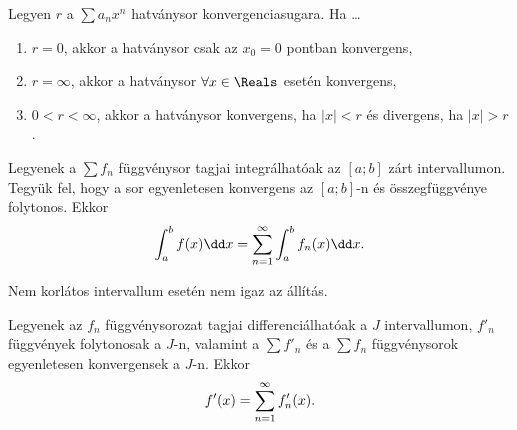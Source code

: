 \documentclass[a4paper, 12pt]{scrartcl}
\begin{document}
\begin{theorem}
  Legyen $r$ a $\sum a_n x^n$ hatványsor konvergenciasugara. Ha \dots
  \begin{enumerate}
    \item $r = 0$, akkor a hatványsor csak az $x_0 = 0$ pontban konvergens,
    \item $r = \infty$, akkor a hatványsor $\forall x \in \Reals$ esetén
          konvergens,
    \item $0 < r < \infty$, akkor a hatványsor konvergens, ha $|x| < r$ és
          divergens, ha $|x| > r$.
  \end{enumerate}

  \begin{center}
  \end{center}
\end{theorem}

\begin{theorem}
  Legyenek a $\sum f_n$ függvénysor tagjai integrálhatóak az $[a; b]$ zárt
  intervallumon. Tegyük fel, hogy a sor egyenletesen konvergens az $[a; b]$-n
  és összegfüggvénye folytonos. Ekkor
  $$
    \int_a^b f(x) \dd x = \sum_{n = 1}^{\infty} \int_a^b f_n(x) \dd x
    \text.
  $$
\end{theorem}

\begin{note}
  Nem korlátos intervallum esetén nem igaz az állítás.
\end{note}

\begin{theorem}
  Legyenek az $f_n$ függvénysorozat tagjai differenciálhatóak a $J$ intervallumon,
  $f'_n$ függvények folytonosak a $J$-n, valamint a $\sum f'_n$ és a $\sum f_n$
  függvénysorok egyenletesen konvergensek a $J$-n. Ekkor
  $$
    f'(x) = \sum_{n = 1}^{\infty} f'_n(x)
    \text.
  $$
\end{theorem}
\end{document}
